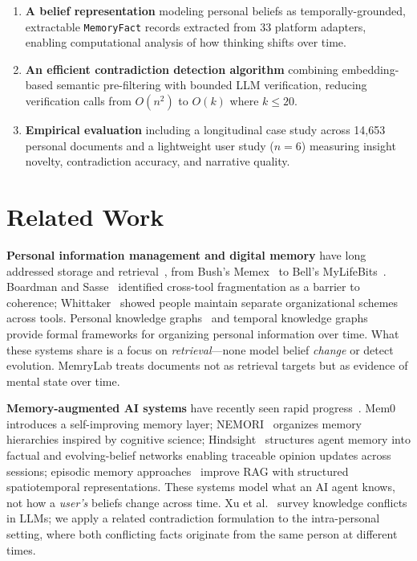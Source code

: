 \documentclass[conference]{IEEEtran}
\begin{document}
\begin{enumerate}
    \item \textbf{A belief representation} modeling personal beliefs as temporally-grounded, extractable \texttt{MemoryFact} records extracted from 33 platform adapters, enabling computational analysis of how thinking shifts over time.
    \item \textbf{An efficient contradiction detection algorithm} combining embedding-based semantic pre-filtering with bounded LLM verification, reducing verification calls from $O(n^2)$ to $O(k)$ where $k \leq 20$.
    \item \textbf{Empirical evaluation} including a longitudinal case study across 14,653 personal documents and a lightweight user study ($n{=}6$) measuring insight novelty, contradiction accuracy, and narrative quality.
\end{enumerate}

\section{Related Work}
\label{sec:related}

\textbf{Personal information management and digital memory} have long addressed storage and retrieval~\cite{jones2007pim,lansdale1988psychology}, from Bush's Memex~\cite{bush1945memex} to Bell's MyLifeBits~\cite{gemmell2002mylifebits,bell2009total}. Boardman and Sasse~\cite{boardman2004stuff} identified cross-tool fragmentation as a barrier to coherence; Whittaker~\cite{whittaker2011personal} showed people maintain separate organizational schemes across tools. Personal knowledge graphs~\cite{balog2019personal,kejriwal2021knowledge} and temporal knowledge graphs~\cite{cai2024tkg_survey,leblay2018temporal} provide formal frameworks for organizing personal information over time. What these systems share is a focus on \emph{retrieval}---none model belief \emph{change} or detect evolution. MemryLab treats documents not as retrieval targets but as evidence of mental state over time.

\textbf{Memory-augmented AI systems} have recently seen rapid progress~\cite{chhikara2025mem0,qian2025memorag,nan2025nemori}. Mem0~\cite{chhikara2025mem0} introduces a self-improving memory layer; NEMORI~\cite{nan2025nemori} organizes memory hierarchies inspired by cognitive science; Hindsight~\cite{latimer2025hindsight} structures agent memory into factual and evolving-belief networks enabling traceable opinion updates across sessions; episodic memory approaches~\cite{rajesh2025episodic} improve RAG with structured spatiotemporal representations. These systems model what an AI agent knows, not how a \emph{user's} beliefs change across time. Xu et al.~\cite{xu2024knowledge} survey knowledge conflicts in LLMs; we apply a related contradiction formulation to the intra-personal setting, where both conflicting facts originate from the same person at different times.
\end{document}
